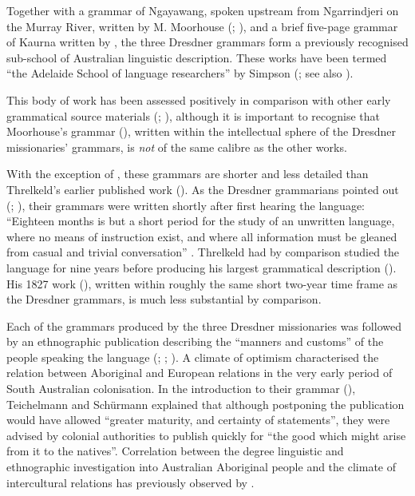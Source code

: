 Together with a grammar of Ngayawang, spoken upstream from Ngarrindjeri on the Murray River, written by M. Moorhouse (\citeyear{moorhouse_vocabulary_1846}; ), and a brief five-page grammar of Kaurna written by \citet{moorhouse_report_1841}, the three Dresdner grammars form a previously recognised sub-school of Australian linguistic description. These works have been termed “the Adelaide School of language researchers” by Simpson (\citeyear[410]{simpson_notes_1992}; see also \citealt[123--126]{simpson_i_2008}).

This body of work has been assessed positively in comparison with other early grammatical source materials (\citealt[2]{ray_aboriginal_1925}; \citealt[667]{capell_history_1970}), although it is important to recognise that Moorhouse’s grammar (\citeyear{moorhouse_vocabulary_1846}), written within the intellectual sphere of the Dresdner missionaries' grammars, is \textit{not} of the same calibre as the other works.

With the exception of \citet{moorhouse_annual_1843}, these grammars are shorter and less detailed than Threlkeld’s earlier published work (\citeyear{threlkeld_australian_1834}). As the Dresdner grammarians pointed out (\citealt[v]{teichelmann_outlines_1840}; \citealt[v]{meyer_vocabulary_1843}), their grammars were written shortly after first hearing the language: “Eighteen months is but a short period for the study of an unwritten language, where no means of instruction exist, and where all information must be gleaned from casual and trivial conversation” \citep[v]{teichelmann_outlines_1840}. Threlkeld had by comparison studied the language for nine years before producing his largest grammatical description (\citeyear{threlkeld_australian_1834}). His 1827 work (), written within roughly the same short two-year time frame as the Dresdner grammars, is much less substantial by comparison.

Each of the grammars produced by the three Dresdner missionaries was followed by an ethnographic publication describing the “manners and customs” of the people speaking the language (\citealt{teichelmann_letter_1841}; \citealt{schurmann_aboriginal_1846}; \citealt{meyer_vocabulary_1843}). A climate of optimism characterised the relation between Aboriginal and European relations in the very early period of South Australian colonisation. In the introduction to their grammar (\citeyear[v]{teichelmann_outlines_1840}), Teichelmann and Schürmann explained that although postponing the publication would have allowed “greater maturity, and certainty of statements”, they were advised by colonial authorities to publish quickly for “the good which might arise from it to the natives”. Correlation between the degree linguistic and ethnographic investigation into Australian Aboriginal people and the climate of intercultural relations has previously observed by \citet[12]{dixon_languages_1980}.

